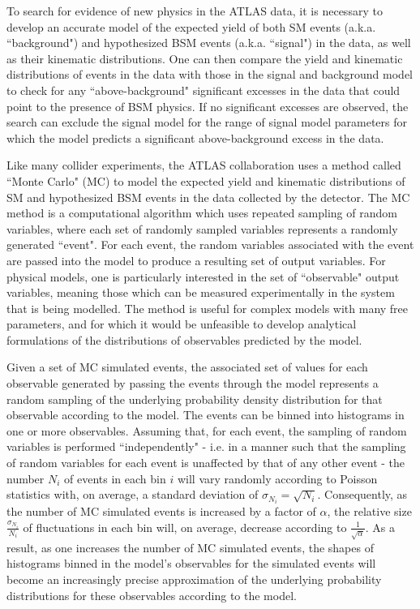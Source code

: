 \label{chapter:mc}

To search for evidence of new physics in the ATLAS data, it is necessary to develop an accurate model of the expected yield of both SM events (a.k.a. ``background") and hypothesized BSM events (a.k.a. ``signal") in the data, as well as their kinematic distributions. One can then compare the yield and kinematic distributions of events in the data with those in the signal and background model to check for any ``above-background" significant excesses in the data that could point to the presence of BSM physics. If no significant excesses are observed, the search can exclude the signal model for the range of signal model parameters for which the model predicts a significant above-background excess in the data.

Like many collider experiments, the ATLAS collaboration uses a method called ``Monte Carlo" (MC) to model the expected yield and kinematic distributions of SM and hypothesized BSM events in the data collected by the detector. The MC method is a computational algorithm which uses repeated sampling of random variables, where each set of randomly sampled variables represents a randomly generated ``event". For each event, the random variables associated with the event are passed into the model to produce a resulting set of output variables. For physical models, one is particularly interested in the set of ``observable" output variables, meaning those which can be measured experimentally in the system that is being modelled. The method is useful for complex models with many free parameters, and for which it would be unfeasible to develop analytical formulations of the distributions of observables predicted by the model. 

Given a set of MC simulated events, the associated set of values for each observable generated by passing the events through the model represents a random sampling of the underlying probability density distribution for that observable according to the model. The events can be binned into histograms in one or more observables. Assuming that, for each event, the sampling of random variables is performed ``independently" - i.e. in a manner such that the sampling of random variables for each event is unaffected by that of any other event - the number $N_i$ of events in each bin $i$ will vary randomly according to Poisson statistics with, on average, a standard deviation of $\sigma_{N_i}=\sqrt{N_i}$. Consequently, as the number of MC simulated events is increased by a factor of $\alpha$, the relative size $\frac{\sigma_{N_i}}{N_i}$ of fluctuations in each bin will, on average, decrease according to $\frac{1}{\sqrt{\alpha}}$. As a result, as one increases the number of MC simulated events, the shapes of histograms binned in the model's observables for the simulated events will become an increasingly precise approximation of the underlying probability distributions for these observables according to the model. 

